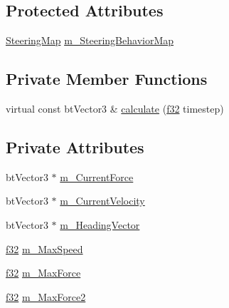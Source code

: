\subsection*{Protected Attributes}
\begin{DoxyCompactItemize}
\item 
\mbox{\hyperlink{classnjli_1_1_steering_behavior_machine_a4140175f3174e6e8d22e977a72220b5d}{Steering\+Map}} \mbox{\hyperlink{classnjli_1_1_steering_behavior_machine_acc24af246957e8392f0fb59d4fd3bd20}{m\+\_\+\+Steering\+Behavior\+Map}}
\end{DoxyCompactItemize}
\subsection*{Private Member Functions}
\begin{DoxyCompactItemize}
\item 
virtual const bt\+Vector3 \& \mbox{\hyperlink{classnjli_1_1_steering_behavior_machine_ac00a02f9f9e37129e300c60fabf23e69}{calculate}} (\mbox{\hyperlink{_util_8h_a5f6906312a689f27d70e9d086649d3fd}{f32}} timestep)
\end{DoxyCompactItemize}
\subsection*{Private Attributes}
\begin{DoxyCompactItemize}
\item 
bt\+Vector3 $\ast$ \mbox{\hyperlink{classnjli_1_1_steering_behavior_machine_a2a8706604ab27ba5ca57be349a18a216}{m\+\_\+\+Current\+Force}}
\item 
bt\+Vector3 $\ast$ \mbox{\hyperlink{classnjli_1_1_steering_behavior_machine_a935ea15268f11582c9fbcdc350ddab19}{m\+\_\+\+Current\+Velocity}}
\item 
bt\+Vector3 $\ast$ \mbox{\hyperlink{classnjli_1_1_steering_behavior_machine_a2df53aa5964dab7b6212f12eefdba0fc}{m\+\_\+\+Heading\+Vector}}
\item 
\mbox{\hyperlink{_util_8h_a5f6906312a689f27d70e9d086649d3fd}{f32}} \mbox{\hyperlink{classnjli_1_1_steering_behavior_machine_a666e277daf2c8273fe3166e0416d9744}{m\+\_\+\+Max\+Speed}}
\item 
\mbox{\hyperlink{_util_8h_a5f6906312a689f27d70e9d086649d3fd}{f32}} \mbox{\hyperlink{classnjli_1_1_steering_behavior_machine_a30aa17a8097bbc87c6b1b613cbb4dffe}{m\+\_\+\+Max\+Force}}
\item 
\mbox{\hyperlink{_util_8h_a5f6906312a689f27d70e9d086649d3fd}{f32}} \mbox{\hyperlink{classnjli_1_1_steering_behavior_machine_af664462dba2acbda423df91209f8ce93}{m\+\_\+\+Max\+Force2}}
\end{DoxyCompactItemize}
